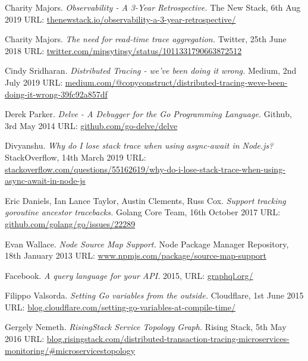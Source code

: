 \documentclass[12pt,pdftex,titlepage]{report}
\begin{document}
\begin{small}
\begin{thebibliography}{69}
        Charity Majors. \textit{Observability - A 3-Year Retrospective.}
        The New Stack, 6th Aug 2019
        {\scriptsize URL:} \url{thenewstack.io/observability-a-3-year-retrospective/}

        Charity Majors. \textit{The need for read-time trace aggregation.}
        Twitter, 25th June 2018
        {\scriptsize URL:} \url{twitter.com/mipsytipsy/status/1011331790663872512}

        Cindy Sridharan. \textit{Distributed Tracing - we've been doing it wrong.}
        Medium, 2nd July 2019
        {\scriptsize URL:} \url{medium.com/@copyconstruct/distributed-tracing-weve-been-doing-it-wrong-39fc92a857df}

        Derek Parker. \textit{Delve - A Debugger for the Go Programming Language.}
        Github, 3rd May 2014
        {\scriptsize URL:} \url{github.com/go-delve/delve}

        Divyanshu. \textit{Why do I lose stack trace when using async-await in Node.js?}
        StackOverflow, 14th March 2019
        {\scriptsize URL:} \url{stackoverflow.com/questions/55162619/why-do-i-lose-stack-trace-when-using-async-await-in-node-js}

        Eric Daniels, Ian Lance Taylor, Austin Clements, Russ Cox. \textit{Support tracking goroutine ancestor tracebacks.}
        Golang Core Team, 16th October 2017
        {\scriptsize URL:} \url{github.com/golang/go/issues/22289}

        Evan Wallace. \textit{Node Source Map Support.}
        Node Package Manager Repository, 18th January 2013 
        {\scriptsize URL:} \url{www.npmjs.com/package/source-map-support}

        Facebook. \textit{A query language for your API.} 
        2015, {\scriptsize URL:} \url{graphql.org/}

        Filippo Valsorda. \textit{Setting Go variables from the outside.}
        Cloudflare, 1st June 2015
        {\scriptsize URL:} \url{blog.cloudflare.com/setting-go-variables-at-compile-time/}

        Gergely Nemeth. \textit{RisingStack Service Topology Graph.}
        Rising Stack, 5th May 2016
        {\scriptsize URL:} \url{blog.risingstack.com/distributed-transaction-tracing-microservices-monitoring/#microservicestopology}


\end{thebibliography}
\end{small}
\end{document}

